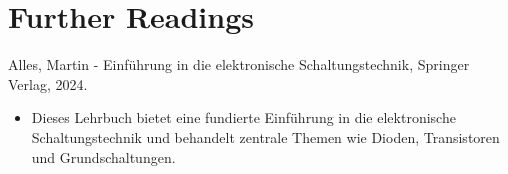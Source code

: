 {
	\label{code:AnwendungMOSFET}
}

\section{Further Readings}
Alles, Martin - Einführung in die elektronische Schaltungstechnik, Springer Verlag, 2024. \cite{Alles:2024}
\begin{itemize}
	\item Dieses Lehrbuch bietet eine fundierte Einführung in die elektronische Schaltungstechnik und behandelt zentrale Themen wie Dioden, Transistoren und Grundschaltungen.
\end{itemize}